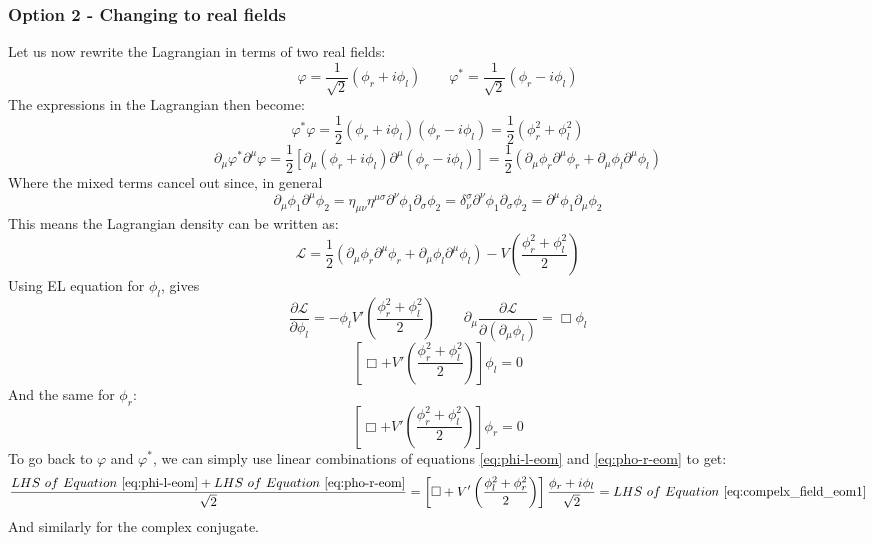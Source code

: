 \documentclass{article}
\begin{document}
\subsubsection{Option 2 - Changing to real fields}
Let us now rewrite the Lagrangian in terms of two real fields:
\begin{equation}
    \varphi = \frac{1}{\sqrt{2}}\left(\phi_r + i\phi_l\right) \qquad
    \varphi^* = \frac{1}{\sqrt{2}}\left(\phi_r - i\phi_l\right)
\end{equation}
The expressions in the Lagrangian then become:
\begin{equation}
    \varphi^*\varphi = \frac{1}{2}\left(\phi_r + i\phi_l\right)\left(\phi_r - i\phi_l\right) = \frac{1}{2}\left(\phi_r^2 + \phi_l^2\right)
\end{equation}
\begin{equation}
    \partial_\mu \varphi^* \partial^\mu \varphi = \frac{1}{2}\left[
        \partial_\mu \left(\phi_r + i\phi_l\right)\partial^\mu \left(\phi_r - i\phi_l\right)
    \right] = \frac{1}{2}\left(
        \partial_\mu \phi_r \partial^\mu \phi_r + \partial_\mu \phi_l \partial^\mu \phi_l
    \right)
\end{equation}
Where the mixed terms cancel out since, in general
\begin{equation}
    \partial_\mu \phi_1 \partial^\mu \phi_2 = \eta_{\mu\nu}\eta^{\mu\sigma}\partial^\nu \phi_1 \partial_\sigma \phi_2 = \delta^\sigma_\nu \partial^\nu \phi_1 \partial_\sigma \phi_2 = \partial^\mu \phi_1 \partial_\mu \phi_2
\end{equation}
This means the Lagrangian density can be written as:
\begin{equation}
    \mathcal{L} = \frac{1}{2}\left(
        \partial_\mu \phi_r \partial^\mu \phi_r + \partial_\mu \phi_l \partial^\mu \phi_l
    \right) - V\left(\frac{\phi_r^2 + \phi_l^2}{2}\right)
\end{equation}
Using EL equation for $\phi_l$, gives
\begin{equation}
    \frac{\partial \mathcal{L}}{\partial \phi_l} = - \phi_l V'\left(\frac{\phi_r^2 + \phi_l^2}{2}\right)
    \qquad
    \partial_\mu \frac{\partial \mathcal{L}}{\partial\left(\partial_\mu \phi_l\right)} = \Box\phi_l
\end{equation}
\begin{equation}
\label{eq:phi-l-eom}
    \left[\Box + V'\left(\frac{\phi_r^2 + \phi_l^2}{2}\right)\right] \phi_l = 0
\end{equation}
And the same for $\phi_r$:
\begin{equation}
\label{eq:pho-r-eom}
    \left[\Box + V'\left(\frac{\phi_r^2 + \phi_l^2}{2}\right)\right] \phi_r = 0
\end{equation}
To go back to $\varphi$ and $\varphi^*$, we can simply use linear combinations of equations \ref{eq:phi-l-eom} and \ref{eq:pho-r-eom} to get:
\begin{equation}
    \frac{LHS \ of \ Equation \ \ref{eq:phi-l-eom} + LHS \ of \  Equation \ \ref{eq:pho-r-eom}}{\sqrt{2}} = \left[\Box + V'\left(\frac{\phi_l^2 + \phi_r^2}{2}\right) \right]\frac{\phi_r + i\phi_l}{\sqrt{2}} = LHS \ of \ Equation \ \ref{eq:compelx_field_eom1}
\end{equation}
And similarly for the complex conjugate.
\end{document}
